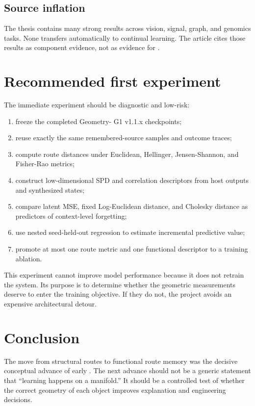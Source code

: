 \subsection{Source inflation}
The thesis contains many strong results across vision, signal, graph, and genomics tasks. None transfers automatically to continual learning. The article cites those results as component evidence, not as evidence for \MMALS{}.


\section{Recommended first experiment}
The immediate experiment should be diagnostic and low-risk:
\begin{enumerate}[leftmargin=1.7em]
  \item freeze the completed Geometry-\MMALS{} G1 v1.1.x checkpoints;
  \item reuse exactly the same remembered-source samples and outcome traces;
  \item compute route distances under Euclidean, Hellinger, Jensen-Shannon, and Fisher-Rao metrics;
  \item construct low-dimensional SPD and correlation descriptors from host outputs and synthesized states;
  \item compare latent MSE, fixed Log-Euclidean distance, and Cholesky distance as predictors of context-level forgetting;
  \item use nested seed-held-out regression to estimate incremental predictive value;
  \item promote at most one route metric and one functional descriptor to a training ablation.
\end{enumerate}
This experiment cannot improve model performance because it does not retrain the system. Its purpose is to determine whether the geometric measurements deserve to enter the training objective. If they do not, the project avoids an expensive architectural detour.


\section{Conclusion}
The move from structural routes to functional route memory was the decisive conceptual advance of early \MMALS{}. The next advance should not be a generic statement that ``learning happens on a manifold.'' It should be a controlled test of whether the correct geometry of each object improves explanation and engineering decisions.

